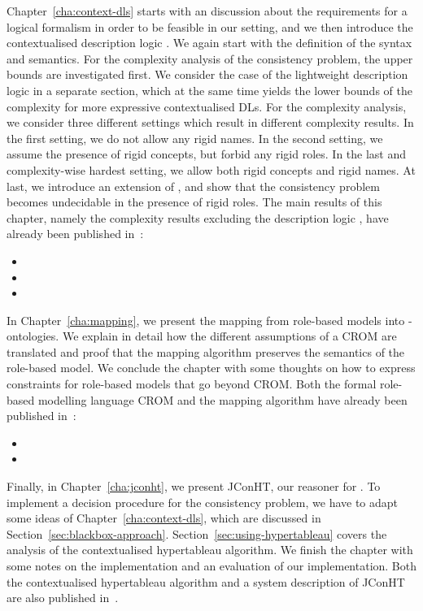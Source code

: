 Chapter~\ref{cha:context-dls} starts with an discussion about the requirements for a logical
formalism in order to be feasible in our setting, and we then introduce the contextualised
description logic \LMLO. We again start with the definition of the syntax and semantics. For the
complexity analysis of the consistency problem, the upper bounds are investigated first. We consider
the case of the lightweight description logic \EL in a separate section, which at the same time
yields the lower bounds of the complexity for more expressive contextualised DLs. For the complexity
analysis, we consider three different settings which result in different complexity results. In the
first setting, we do not allow any rigid names.  In the second setting, we assume the presence of
rigid concepts, but forbid any rigid roles. In the last and complexity-wise hardest setting, we
allow both rigid concepts and rigid names.
%
At last, we introduce an extension of \LMLO, and show that the consistency problem becomes
undecidable in the presence of rigid roles. The main results of this chapter, namely the complexity
results excluding the description logic \SHOIQ, have already been published in~\cite{BoLi-FroCoS15,
  BoLi-DL15, BoLi-LTCS-15-04}:
\begin{itemize}
\item {}
\item {}
\item {}
\end{itemize}


In Chapter~\ref{cha:mapping}, we present the mapping from role-based models into \LMLO-ontologies.
We explain in detail how the different assumptions of a CROM are translated and proof that the
mapping algorithm preserves the semantics of the role-based model.  We conclude the chapter with
some thoughts on how to express constraints for role-based models that go beyond CROM.  Both the
formal role-based modelling language CROM and the mapping algorithm have already been published
in~\cite{KBG-SLE15,BoKu-JIST17}:
\begin{itemize}
\item {}
\item {}
\end{itemize}


Finally, in Chapter~\ref{cha:jconht}, we present JConHT, our reasoner for \LMLO. To implement a
decision procedure for the consistency problem, we have to adapt some ideas of
Chapter~\ref{cha:context-dls}, which are discussed in
Section~\ref{sec:blackbox-approach}. Section~\ref{sec:using-hypertableau} covers the analysis of the
contextualised hypertableau algorithm. We finish the chapter with some notes on the implementation
and an evaluation of our implementation. Both the contextualised hypertableau algorithm and a system
description of JConHT are also published in~\cite{BoKu-JIST17}.


